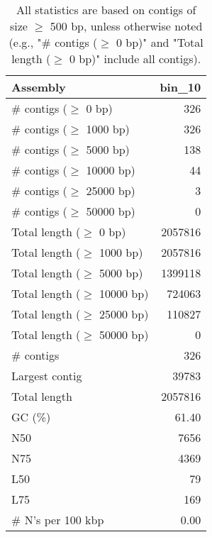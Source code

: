 \documentclass[12pt,a4paper]{article}
\begin{document}
\begin{table}[ht]
\begin{center}
\caption{All statistics are based on contigs of size $\geq$ 500 bp, unless otherwise noted (e.g., "\# contigs ($\geq$ 0 bp)" and "Total length ($\geq$ 0 bp)" include all contigs).}
\begin{tabular}{|l*{1}{|r}|}
\hline
Assembly & bin\_10 \\ \hline
\# contigs ($\geq$ 0 bp) & 326 \\ \hline
\# contigs ($\geq$ 1000 bp) & 326 \\ \hline
\# contigs ($\geq$ 5000 bp) & 138 \\ \hline
\# contigs ($\geq$ 10000 bp) & 44 \\ \hline
\# contigs ($\geq$ 25000 bp) & 3 \\ \hline
\# contigs ($\geq$ 50000 bp) & 0 \\ \hline
Total length ($\geq$ 0 bp) & 2057816 \\ \hline
Total length ($\geq$ 1000 bp) & 2057816 \\ \hline
Total length ($\geq$ 5000 bp) & 1399118 \\ \hline
Total length ($\geq$ 10000 bp) & 724063 \\ \hline
Total length ($\geq$ 25000 bp) & 110827 \\ \hline
Total length ($\geq$ 50000 bp) & 0 \\ \hline
\# contigs & 326 \\ \hline
Largest contig & 39783 \\ \hline
Total length & 2057816 \\ \hline
GC (\%) & 61.40 \\ \hline
N50 & 7656 \\ \hline
N75 & 4369 \\ \hline
L50 & 79 \\ \hline
L75 & 169 \\ \hline
\# N's per 100 kbp & 0.00 \\ \hline
\end{tabular}
\end{center}
\end{table}
\end{document}

